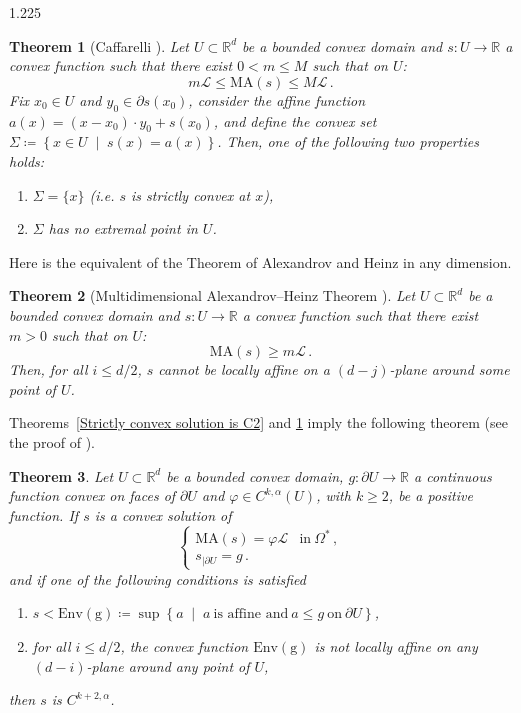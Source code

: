 \documentclass[reqno, a4paper]{amsart}
\numberwithin{equation}{section}
\numberwithin{figure}{section}
\newtheorem{theorem}{Theorem}[section]
\theoremstyle{definition}
\theoremstyle{remark}
\newcommand{\R}{\mathbb{R}} %
\newcommand{\MA}{\mathrm{MA}} %
\newcommand{\st}{\; \middle\vert \;} %
\begin{document}
\begin{spacing}{1.225}
\begin{theorem}[{Caffarelli \cite[Theorem~4.10]{Figalli_17}}]
\label{theo Caffarelli}
Let $U \subset \R^d$ be a bounded convex domain and $s:U \to \R$ a convex function such that there exist $0<m \leq M$ such that on $U$:
\begin{equation*}
 m\mathcal{L} \leq \MA(s) \leq M\mathcal{L} \, . 
\end{equation*}
Fix $x_0 \in U$ and $y_0\in \partial s(x_0)$, consider the affine function $a(x)= (x-x_0) \cdot y_0 + s(x_0)$, and define the convex set $\Sigma \coloneqq \left\lbrace x \in U \st s(x)=a(x) \right\rbrace$. Then, one of the following two properties holds:
\begin{enumerate}
 \item $\Sigma = \{x\}$ (i.e. $s$ is strictly convex at $x$),
 \item $\Sigma$ has no extremal point in $U$. 
\end{enumerate}
\end{theorem}

Here is the equivalent of the Theorem of Alexandrov and Heinz in any dimension.

\begin{theorem}[Multidimensional Alexandrov--Heinz Theorem {\cite[Theorem~2.34]{Bonsante_Fillastre_17}}]
Let $U \subset \R^d$ be a bounded convex domain and $s:U \to \R$ a convex function such that there exist $m>0$ such that on $U$:
\begin{equation*}
\MA(s) \geq m\mathcal{L} \, . 
\end{equation*} 
Then, for all $i \leq d/2$, $s$ cannot be locally affine on a $(d-j)$-plane around some point of $U$. 
\end{theorem}

Theorems~\ref{Strictly convex solution is C2} and \ref{theo Caffarelli} imply the following theorem (see the proof of \cite[Corollary~2.37]{Bonsante_Fillastre_17}). 

\begin{theorem}
\label{theo regularity higher d}
Let $U \subset \R^d$ be a bounded convex domain, $g:\partial U \to \R$ a continuous function convex on faces of $\partial U$ and $\varphi \in C^{k,\alpha}(U)$, with $k\geq 2$, be a positive function. If $s$ is a convex solution of 
\begin{equation*}
\begin{cases}
\MA(s)= \varphi \mathcal{L} & \text{in} \ \Omega^* \, ,\\
s_{\vert \partial U} = g \, . 
\end {cases}
\end{equation*}
and if one of the following conditions is satisfied 
\begin{enumerate}
\item $s<\mathrm{Env(g)} \coloneqq \sup \left\lbrace a\st a \ \text{is affine and} \ a\leq g \ \text{on} \ \partial U\right\rbrace$,
\item for all $i \leq d/2$, the convex function $\mathrm{Env(g)}$ is not locally affine on any $(d-i)$-plane around any point of $U$,
\end{enumerate}
then $s$ is $C^{k+2,\alpha}$. 
\end{theorem}



\end{spacing}
\end{document}
